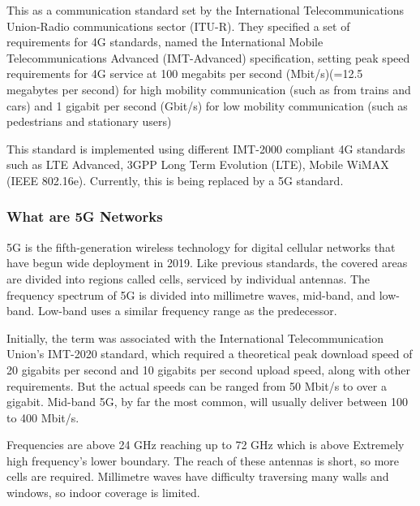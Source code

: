This as a communication standard set by the International Telecommunications Union-Radio communications sector (ITU-R). They specified a set of requirements for 4G standards, named the International Mobile Telecommunications Advanced (IMT-Advanced) specification, setting peak speed requirements for 4G service at 100 megabits per second (Mbit/s)(=12.5 megabytes per second) for high mobility communication (such as from trains and cars) and 1 gigabit per second (Gbit/s) for low mobility communication (such as pedestrians and stationary users)\cite{Requirement}


\vspace{12pt}
\clearpage
This standard is implemented using different IMT-2000 compliant 4G standards such as LTE Advanced, 3GPP Long Term Evolution (LTE), Mobile WiMAX (IEEE 802.16e). Currently, this is being replaced by a 5G standard.


\vspace{12pt}



\subsubsection{What are 5G Networks}
\vspace{12pt}
5G is the fifth-generation wireless technology for digital cellular networks that have begun wide deployment in 2019. Like previous standards, the covered areas are divided into regions called cells, serviced by individual antennas. The frequency spectrum of 5G is divided into millimetre waves, mid-band, and low-band. Low-band uses a similar frequency range as the predecessor.


\vspace{12pt}
Initially, the term was associated with the International Telecommunication Union's IMT-2020 standard, which required a theoretical peak download speed of 20 gigabits per second and 10 gigabits per second upload speed, along with other requirements. But the actual speeds can be ranged from 50 Mbit/s to over a gigabit. Mid-band 5G, by far the most common, will usually deliver between 100 to 400 Mbit/s.

\vspace{12pt}


Frequencies are above 24 GHz reaching up to 72 GHz which is above Extremely high frequency's lower boundary. The reach of these antennas is short, so more cells are required. Millimetre waves have difficulty traversing many walls and windows, so indoor coverage is limited.

